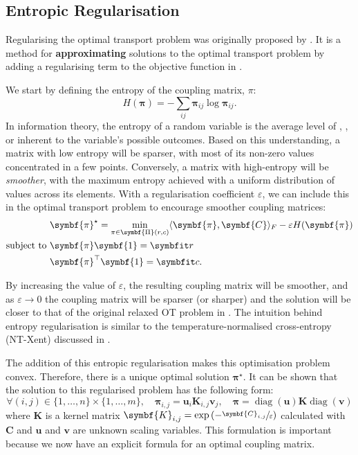 \subsection{Entropic Regularisation}\label{ssec:ot-entropic-reg}

Regularising the optimal transport problem was originally proposed by \textcite{hitchcock1941distribution}. It is a method for \textbf{approximating} solutions to the optimal transport problem by adding a regularising term to the objective function in .

We start by defining the entropy of the coupling matrix, $\pi$:
\begin{equation}
    H(\symbf{\pi}) = -\sum_{ij}\symbf{\pi}_{ij}\log\symbf{\pi}_{ij}.
\end{equation}
In information theory, the entropy of a random variable is the average level of , , or  inherent to the variable's possible outcomes. Based on this understanding, a matrix with low entropy will be sparser, with most of its non-zero values concentrated in a few points. Conversely, a matrix with high-entropy will be \textit{smoother}, with the maximum entropy achieved with a uniform distribution of values across its elements. With a regularisation coefficient $\varepsilon$, we can include this in the optimal transport problem to encourage smoother coupling matrices:
\begin{align}
& \symbf{\pi}^\star = \min_{\pi \in \symbf{\Pi}(r, c)}\langle\symbf{\pi},\symbf{C}\rangle_{F} -\varepsilon H(\symbf{\pi})\\
\text{subject to } &\symbf{\pi}\symbf{1} = \bfitr \nonumber\\
&\symbf{\pi}^{\top}\symbf{1} = \bfitc. \nonumber
\end{align}

By increasing the value of $\varepsilon$, the resulting coupling matrix will be smoother, and as $\varepsilon \rightarrow 0$ the coupling matrix will be sparser (or sharper) and the solution will be closer to that of the original relaxed OT problem in . The intuition behind entropy regularisation is similar to the temperature-normalised cross-entropy (NT-Xent) discussed in .

The addition of this entropic regularisation makes this optimisation problem convex. Therefore, there is a unique optimal solution $\symbf{\pi}^\star$. It can be shown that the solution to this regularised problem has the following form:
\begin{equation}
    \forall (i,j) \in \{1,…,n\}\times \{1, …, m\},\quad \symbf{\pi}_{i,j} = \symbf{u}_i \symbf{K}_{i,j} \symbf{v}_j, \quad \symbf{\pi} = \operatorname{diag}(\symbf{u}) \symbf{K} \operatorname{diag}(\symbf{v})
    \label{eqn:ot-mat-scaling}
\end{equation}
where $\symbf{K}$ is a kernel matrix $\symbf{K}_{i,j}=\exp{(-\sfrac{\symbf{C}_{i,j}}{\varepsilon})}$ calculated with $\symbf{C}$ and $\symbf{u}$ and $\symbf{v}$ are unknown scaling variables. This formulation is important because we now have an explicit formula for an optimal coupling matrix.

